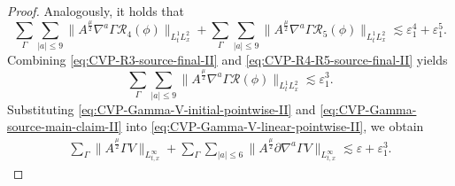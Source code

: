 \documentclass[11pt,twoside]{article}
\def\p{\partial}
\def\ve{\varepsilon}
\def\ls{\lesssim}
\theoremstyle{plain}
\theoremstyle{definition}
\theoremstyle{assumption}
\numberwithin{equation}{section}
\begin{document}
\begin{proof}
	Analogously, it holds that	
		\begin{equation}
			\label{eq:CVP-R4-R5-source-final-II}
			\sum_{\Gamma}
			\sum_{|a|\le 9}
			\big\|
			A^{\frac{\mu}{2}}
			\nabla^a\Gamma\mathcal R_4(\phi)
			\big\|_{L^1_tL^2_x}
			+\sum_{\Gamma}
			\sum_{|a|\le 9}
			\big\|
			A^{\frac{\mu}{2}}
			\nabla^a\Gamma\mathcal R_5(\phi)
			\big\|_{L^1_tL^2_x}
			\ls
			\ve_1^4+\ve_1^5.
		\end{equation}
		Combining \eqref{eq:CVP-R3-source-final-II} and
		\eqref{eq:CVP-R4-R5-source-final-II} yields
		\begin{equation}
			\label{eq:CVP-Gamma-source-main-claim-II}
			\sum_{\Gamma}
			\sum_{|a|\le 9}
			\big\|
			A^{\frac{\mu}{2}}
			\nabla^a\Gamma\mathcal R(\phi)
			\big\|_{L^1_tL^2_x}\ls
			\ve_1^3.
		\end{equation}
		Substituting \eqref{eq:CVP-Gamma-V-initial-pointwise-II} and
		\eqref{eq:CVP-Gamma-source-main-claim-II} into
		\eqref{eq:CVP-Gamma-V-linear-pointwise-II}, we obtain
		\begin{equation}
			\label{eq:CVP-Gamma-V-pointwise-final-II}
			\begin{aligned}
				\sum_{\Gamma}
				\big\|
				A^{\frac{\mu}{2}}\Gamma V
				\big\|_{L^\infty_{t,x}}
				+\sum_{\Gamma}
				\sum_{|a|\le 6}
				\big\|
				A^{\frac{\mu}{2}}
				\p\nabla^a\Gamma V
				\big\|_{L^\infty_{t,x}}
				\ls
				\ve+\ve_1^3.
			\end{aligned}
		\end{equation}
		

\end{proof}
\end{document}
